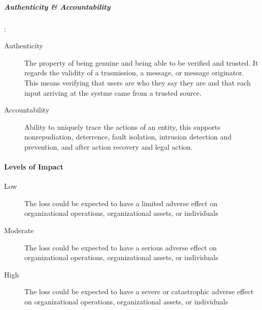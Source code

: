 \documentclass{article}
\begin{document}
            \subparagraph{Authenticity \& Accountability}:
                    \begin{description}
                        \item[Authenticity]  The property of being genuine and being able to be verified and trusted. It regards the validity of a trasmission, a message, or message originator. This means verifying that users are who they say they are and that each input arriving at the systme came from a trusted source. 
                        \item[Accountability] Ability to uniquely trace the actions of an entity, this supports nonrepudiation, deterrence, fault isolation, intrusion detection and prevention, and after action recovery and legal action.  
                    \end{description}

        \paragraph{Levels of Impact}
                    \begin{description}
                        \item[Low] The loss could be expected to have a limited adverse effect on organizational operations, organizational assets, or individuals
                        \item[Moderate] The loss could be expected to have a serious adverse effect on organizational operations, organizational assets, or individuals
                        \item[High] The loss could be expected to have a severe or catastrophic adverse effect on organizational operations, organizational assets, or individuals
                    \end{description}
\end{document}

